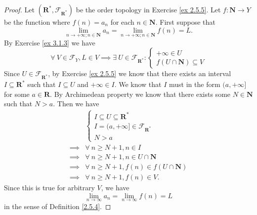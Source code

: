 \begin{proof}
    Let \((\mathbf{R}^*, \mathcal{F}_{\mathbf{R}^*})\) be the order topology in Exercise \ref{ex 2.5.5}.
    Let \(f : \mathbf{N} \to Y\) be the function where \(f(n) = a_n\) for each \(n \in \mathbf{N}\).
    First suppose that
    \[
        \lim_{n \to +\infty ; n \in \mathbf{N}} a_n = \lim_{n \to +\infty ; n \in \mathbf{N}} f(n) = L.
    \]
    By Exercise \ref{ex 3.1.3} we have
    \[
        \forall\ V \in \mathcal{F}_Y, L \in V \implies \exists\ U \in \mathcal{F}_{\mathbf{R}^*} : \begin{cases}
            +\infty \in U \\
            f(U \cap \mathbf{N}) \subseteq V
        \end{cases}
    \]
    Since \(U \in \mathcal{F}_{\mathbf{R}^*}\), by Exercise \ref{ex 2.5.5} we know that there exists an interval \(I \subseteq \mathbf{R}^*\) such that \(I \subseteq U\) and \(+\infty \in I\).
    We know that \(I\) must in the form \((a, +\infty]\) for some \(a \in \mathbf{R}\).
    By Archimedean property we know that there exists some \(N \in \mathbf{N}\) such that \(N > a\).
    Then we have
    \begin{align*}
                 & \begin{cases}
            I \subseteq U \subseteq \mathbf{R}^*            \\
            I = (a, +\infty] \in \mathcal{F}_{\mathbf{R}^*} \\
            N > a
        \end{cases}                           \\
        \implies & \forall\ n \geq N + 1, n \in I                       \\
        \implies & \forall\ n \geq N + 1, n \in U \cap \mathbf{N}       \\
        \implies & \forall\ n \geq N + 1, f(n) \in f(U \cap \mathbf{N}) \\
        \implies & \forall\ n \geq N + 1, f(n) \in V.
    \end{align*}
    Since this is true for arbitrary \(V\), we have
    \[
        \lim_{n \to \infty} a_n = \lim_{n \to \infty} f(n) = L
    \]
    in the sense of Definition \ref{2.5.4}.


\end{proof}
